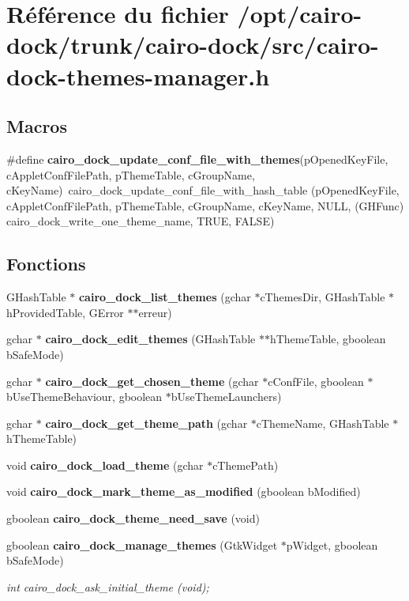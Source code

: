 \section{Référence du fichier /opt/cairo-dock/trunk/cairo-dock/src/cairo-dock-themes-manager.h}
\label{cairo-dock-themes-manager_8h}
\subsection*{Macros}
\begin{CompactItemize}
\item 
\#define {\bf cairo\_\-dock\_\-update\_\-conf\_\-file\_\-with\_\-themes}(pOpenedKeyFile, cAppletConfFilePath, pThemeTable, cGroupName, cKeyName)~cairo\_\-dock\_\-update\_\-conf\_\-file\_\-with\_\-hash\_\-table (pOpenedKeyFile, cAppletConfFilePath, pThemeTable, cGroupName, cKeyName, NULL, (GHFunc) cairo\_\-dock\_\-write\_\-one\_\-theme\_\-name, TRUE, FALSE)
\end{CompactItemize}
\subsection*{Fonctions}
\begin{CompactItemize}
\item 
GHashTable $\ast$ {\bf cairo\_\-dock\_\-list\_\-themes} (gchar $\ast$cThemesDir, GHashTable $\ast$hProvidedTable, GError $\ast$$\ast$erreur)
\item 
gchar $\ast$ {\bf cairo\_\-dock\_\-edit\_\-themes} (GHashTable $\ast$$\ast$hThemeTable, gboolean bSafeMode)
\item 
gchar $\ast$ {\bf cairo\_\-dock\_\-get\_\-chosen\_\-theme} (gchar $\ast$cConfFile, gboolean $\ast$bUseThemeBehaviour, gboolean $\ast$bUseThemeLaunchers)
\item 
gchar $\ast$ {\bf cairo\_\-dock\_\-get\_\-theme\_\-path} (gchar $\ast$cThemeName, GHashTable $\ast$hThemeTable)
\item 
void {\bf cairo\_\-dock\_\-load\_\-theme} (gchar $\ast$cThemePath)
\item 
void {\bf cairo\_\-dock\_\-mark\_\-theme\_\-as\_\-modified} (gboolean bModified)
\item 
gboolean {\bf cairo\_\-dock\_\-theme\_\-need\_\-save} (void)
\item 
gboolean {\bf cairo\_\-dock\_\-manage\_\-themes} (GtkWidget $\ast$pWidget, gboolean bSafeMode)
\begin{CompactList}\small\item\em int cairo\_\-dock\_\-ask\_\-initial\_\-theme (void); \item\end{CompactList}\end{CompactItemize}


